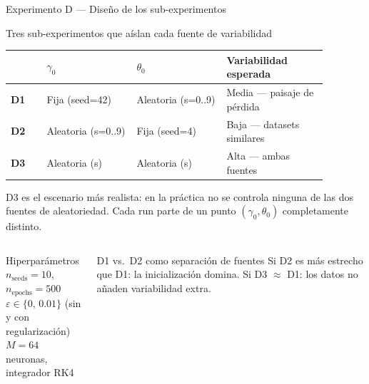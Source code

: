 \documentclass[10pt]{beamer}
\begin{document}
\begin{frame}{Experimento D — Diseño de los sub-experimentos}

\begin{block}{Tres sub-experimentos que aíslan cada fuente de variabilidad}
\begin{tabular}{p{0.10\linewidth}p{0.25\linewidth}p{0.25\linewidth}p{0.28\linewidth}}
  \toprule
  & $\gamma_0$ & $\theta_0$ & Variabilidad esperada \\
  \midrule
  \textbf{D1} & Fija (seed=42) & Aleatoria (s=0..9) & Media — paisaje de pérdida \\[3pt]
  \textbf{D2} & Aleatoria (s=0..9) & Fija (seed=4) & Baja — datasets similares \\[3pt]
  \textbf{D3} & Aleatoria (s) & Aleatoria (s) & Alta — ambas fuentes \\
  \bottomrule
\end{tabular}
\end{block}

\medskip
D3 es el escenario más realista: en la práctica no se controla ninguna de las dos fuentes de aleatoriedad. Cada run parte de un punto $(\gamma_0, \theta_0)$ completamente distinto.

\bigskip
\begin{columns}
\begin{block}{Hiperparámetros}
  $n_\text{seeds} = 10$, $n_\text{epochs} = 500$\\
  $\varepsilon \in \{0,\, 0.01\}$ (sin y con regularización)\\
  $M = 64$ neuronas, integrador RK4
\end{block}
\begin{alertblock}{D1 vs.\ D2 como separación de fuentes}
  Si D2 es más estrecho que D1: la inicialización domina. Si D3 $\approx$ D1: los datos no añaden variabilidad extra.
\end{alertblock}
\end{columns}

\end{frame}
\end{document}
